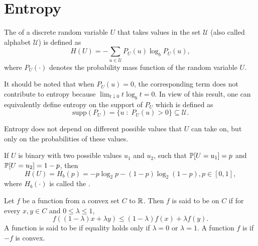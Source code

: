 \documentclass[11pt,a4paper]{article}
\begin{document}
\nocite{*}

\section{Entropy}

\begin{definition}
    The  of a discrete random variable $U$ that takes values in the set $\mathcal{U}$ (also called alphabet $\mathcal{U}$) is defined as 
    \begin{equation*}
        H(U) = -\sum_{u\in \mathcal{U}} P_U(u) \log_b P_U(u),
    \end{equation*}
    where $P_U(\cdot)$ denotes the probability mass function of the random variable $U$.
\end{definition}

\begin{remark}
    It should be noted that when $P_U(u) = 0$, the corresponding term does not contribute to entropy because $\lim_{t\downarrow 0} t\log_b t = 0$. In view of this result, one can equivalently define entropy on the support of $P_U$ which is defined as
    \begin{equation*}
        \text{supp}(P_U) = \{u\;:\; P_U(u)>0 \} \subseteq \mathcal{U}.
    \end{equation*}
\end{remark}

\begin{remark}
    Entropy does not depend on different possible values that $U$ can take on, but only on the probabilities of these values.
\end{remark}

\begin{definition}
    If $U$ is binary with two possible values $u_1$ and $u_2$, such that $\mathbb{P}[U = u_1] = p$ and $\mathbb{P}[U = u_2] = 1-p$, then 
    \begin{equation*}
        H(U) = H_b(p) = -p\log_2 p -(1-p)\log_2 (1-p), p\in[0,1],
    \end{equation*}
    where $H_b(\cdot)$ is called the .
\end{definition}

\begin{definition}
    Let $f$ be a function from a convex set $C$ to $\mathbb{R}$. Then $f$ is said to be  on $C$ if for every $x,y\in C$ and $0\le\lambda \le 1$,
    \begin{equation*}
        f((1-\lambda)x+\lambda y) \le (1-\lambda) f(x) + \lambda f(y).
    \end{equation*} 
    A function is said to be  if equality holds only if $\lambda = 0$ or $\lambda = 1$. A function $f$ is  if $-f$ is convex.
\end{definition}
\end{document}
